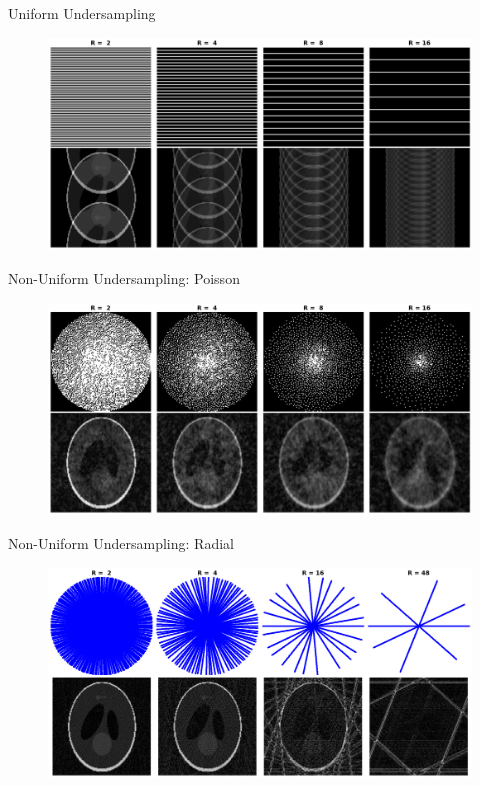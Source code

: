 \documentclass[aspectratio=169]{beamer}
\begin{document}
	\begin{frame}{Uniform Undersampling}
		\begin{figure}
			\centering
			\includegraphics[width=\textwidth]{figures/usamp_cartes.png}
		\end{figure}
	\end{frame}
	
	\begin{frame}{Non-Uniform Undersampling: Poisson}
		\begin{figure}
			\centering
			\includegraphics[width=\textwidth]{figures/usamp_poisson.png}
		\end{figure}
	\end{frame}
	
	\begin{frame}{Non-Uniform Undersampling: Radial}
		\begin{figure}
			\centering
			\includegraphics[width=\textwidth]{figures/usamp_radial.png}
		\end{figure}
	\end{frame}
	
\end{document}
